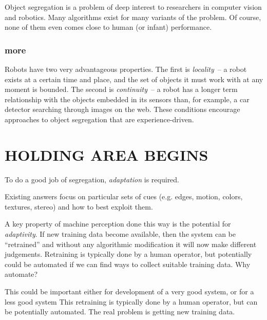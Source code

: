 Object segregation is a problem of deep interest to researchers in
computer vision and robotics.  Many algorithms exist for many variants
of the problem.  
Of course, none of them even comes close to human (or
infant) performance.  


\subsubsection{more}


%
Robots have
two very
advantageous properties.  
%
The first is
{\em locality}~-- a robot exists at a certain time and place, and the
set of objects it must work with at any moment is bounded.  
%
The second is
{\em continuity}~-- a robot has a longer term relationship with
the objects embedded in its sensors than, for example, a car 
detector searching through images on the web.
%
These conditions encourage approaches to object segregation
that are experience-driven.
%

\section{HOLDING AREA BEGINS}



To do a good job of segregation, {\em adaptation} is required.


Existing answers
focus on particular sets of cues (e.g. edges, motion, colors,
textures, stereo) and how to best exploit them.



A key property of machine perception done this way is the potential 
for {\em adaptivity}.  If new training data become available,
then the system can be ``retrained'' and without any algorithmic
modification it will now make different judgements.
%
Retraining is typically done by a human operator, but potentially 
could be automated if we can find ways to collect suitable
training data.  Why automate?


This could be important either for development of a very good system,
or for a less good system
%
This retraining is typically done by a human operator,
but can be potentially automated.  The real problem is getting
new training data.

